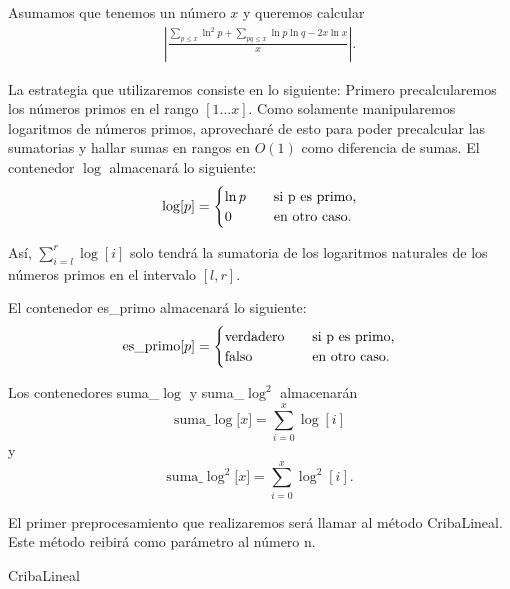 Asumamos que tenemos un n\'umero $x$ y queremos calcular
\begin{align}
\left|\frac{\sum_{p \leq x} \ln^2 p + \sum_{pq \leq x} \ln p \ln q - 2x\ln x}{x}\right|.
\end{align}

La estrategia que utilizaremos consiste en lo siguiente:
Primero precalcularemos los n\'umeros primos en el rango $[1 \dots x]$.
Como solamente manipularemos logaritmos de n\'umeros primos, aprovechar\'e de esto para poder precalcular
las sumatorias y hallar sumas en rangos en $O(1)$ como diferencia de sumas.
El contenedor $\log$ almacenar\'a lo siguiente:
\[
\log[p] =
\begin{cases}
\ln p &\quad\text{si }$p$\text{ es primo,}\\
0 &\quad\text{en otro caso.}
\end{cases}
\]

As\'i, $\sum_{i = l}^r \log[i]$ solo tendr\'a la sumatoria de
los logaritmos naturales de los n\'umeros primos en el intervalo $[l, r]$.

El contenedor es\_primo almacenar\'a lo siguiente:
\[
\text{es\_primo[$p$]} =
\begin{cases}
\text{verdadero} &\quad\text{si }$p$\text{ es primo,}\\
\text{falso} &\quad\text{en otro caso.}
\end{cases}
\]

Los contenedores suma\_$\log$ y suma\_$\log^2$ almacenar\'an
\[
\text{suma\_$\log$[$x$]} = \sum_{i = 0}^x \log[i]
\]
y
\[
\text{suma\_$\log^2$[$x$]} = \sum_{i = 0}^x \log^2[i].
\]

El primer preprocesamiento que realizaremos ser\'a llamar al m\'etodo CribaLineal.
Este m\'etodo reibir\'a como par\'ametro al n\'umero n. 

\begin{algorithm}[H]
\SetAlgoLined
\DontPrintSemicolon
{}
\caption{CribaLineal\label{CL}}
\end{algorithm}

